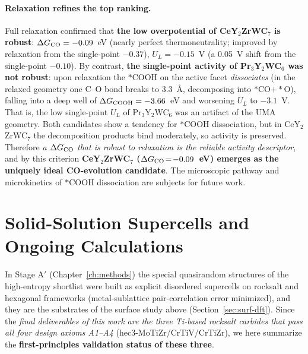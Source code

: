 \documentclass[11pt,a4paper]{report}
\begin{document}
\paragraph{Relaxation refines the top ranking.} Full relaxation confirmed that \textbf{the low overpotential of CeY$_2$ZrWC$_7$ is robust}:
$\Delta G_{\rm CO}=-0.09$~eV (nearly perfect thermoneutrality; improved by relaxation from the single-point $-0.37$),
$U_L=-0.15$~V (a 0.05~V shift from the single-point $-0.10$). By contrast, \textbf{the single-point activity of Pr$_3$Y$_2$WC$_6$ was not
robust}: upon relaxation the $*$COOH on the active facet \emph{dissociates} (in the relaxed geometry one C--O bond breaks to 3.3~\AA,
decomposing into $*$CO$+*$O), falling into a deep well of $\Delta G_{\rm COOH}=-3.66$~eV and worsening $U_L$ to $-3.1$~V. That is,
the low single-point $U_L$ of Pr$_3$Y$_2$WC$_6$ was an artifact of the UMA geometry. Both candidates show a tendency for $*$COOH dissociation,
but in CeY$_2$ZrWC$_7$ the decomposition products bind moderately, so activity is preserved. Therefore \emph{a $\Delta G_{\rm CO}$ that is
robust to relaxation is the reliable activity descriptor}, and by this criterion \textbf{CeY$_2$ZrWC$_7$ ($\Delta
G_{\rm CO}\!=\!-0.09$~eV) emerges as the uniquely ideal CO-evolution candidate}. The microscopic pathway and microkinetics of
$*$COOH dissociation are subjects for future work.

\section{Solid-Solution Supercells and Ongoing Calculations}
\label{sec:outstanding}
In Stage A$'$ (Chapter~\ref{ch:methods}) the special quasirandom structures of the high-entropy shortlist were built as explicit disordered
supercells on rocksalt and hexagonal frameworks (metal-sublattice pair-correlation error minimized), and they are the substrates of the surface
study above (Section~\ref{sec:surf-dft}). Since the \emph{final deliverables of this work are the three Ti-based rocksalt carbides that pass all four
design axioms A1--A4} (hec3-MoTiZr/CrTiV/CrTiZr), we here summarize the \textbf{first-principles validation status of these three}.
\end{document}
